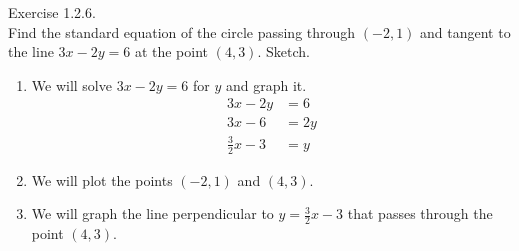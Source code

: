 \documentclass{article}
\begin{document}
Exercise 1.2.6.\\
Find the standard equation of the circle passing through $(-2,1)$ and tangent to the line $3x-2y=6$ at the point $(4,3)$. Sketch.\\
\begin{enumerate}
    \item We will  solve $3x-2y=6$ for $y$ and graph it.
        \begin{align*}
            3x-2y&=6\\
            3x-6&=2y\\
            \frac{3}{2}x-3&=y
        \end{align*}
    \item We will plot the points $(-2,1)$ and $(4,3)$.
    \item We will graph the line perpendicular to $y=\frac{3}{2}x-3$ that passes through the point $(4,3)$.
    

\end{enumerate}
\end{document}
